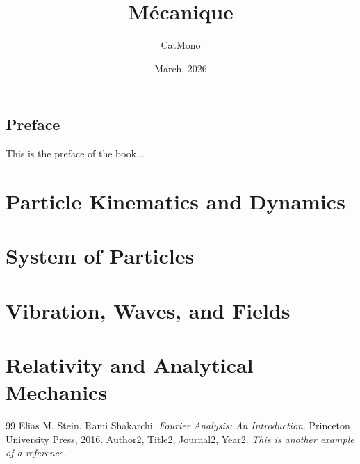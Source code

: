\documentclass[11pt]{../../TexTemplate/elegantbook} %
\title{Mécanique} %
\author{CatMono} %
\date{March, 2026} %
\begin{document}
\maketitle %

\frontmatter        %
\tableofcontents    %

\chapter{Preface}   %
This is the preface of the book...

\mainmatter         %

\part{Particle Kinematics and Dynamics}
\part{System of Particles}
\part{Vibration, Waves, and Fields}
\part{Relativity and Analytical Mechanics}

\begin{thebibliography}{99} 
 Elias M. Stein, Rami Shakarchi. \emph{Fourier Analysis: An Introduction}. Princeton University Press, 2016.
 Author2, Title2, Journal2, Year2. \emph{ This is another example of a reference.}
\end{thebibliography}
\end{document}
